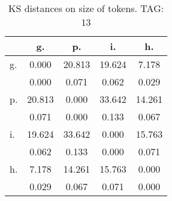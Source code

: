 \begin{table}[h!]
\begin{center}
\begin{tabular}{| l | c | c | c | c |}\hline
 & g. & p. & i. & h. \\\hline
g. & 0.000  & 20.813  & 19.624  & 7.178 \\\hline
 & 0.000  & 0.071  & 0.062  & 0.029 \\\hline
p. & 20.813  & 0.000  & 33.642  & 14.261 \\\hline
 & 0.071  & 0.000  & 0.133  & 0.067 \\\hline
i. & 19.624  & 33.642  & 0.000  & 15.763 \\\hline
 & 0.062  & 0.133  & 0.000  & 0.071 \\\hline
h. & 7.178  & 14.261  & 15.763  & 0.000 \\\hline
 & 0.029  & 0.067  & 0.071  & 0.000 \\\hline
\end{tabular}
\caption{KS distances on size of tokens. TAG: 13}
\end{center}
\end{table}